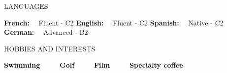 \documentclass{resume} %
\begin{document}
%
%

\begin{rSection}{LANGUAGES}

{\bf French:} \ \ {Fluent - C2} \hfill {\bf English:} \ \ {Fluent - C2} \hfill {\bf Spanish:} \ \ {Native - C2} \hfill {\bf German:} \ \ {Advanced - B2}

\end{rSection}


%
%




\begin{rSection}{HOBBIES AND INTERESTS}

    {\bf Swimming} \ \ \ \ \ {\bf Golf} \ \ \ \ \ {\bf Film} \ \ \ \ \ {\bf Specialty coffee}
    
\end{rSection}
\end{document}
